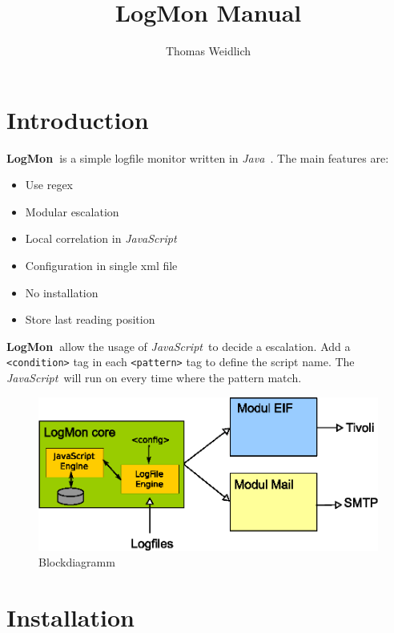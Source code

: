 \documentclass[11pt,a4paper]{article}
\title{LogMon Manual}
\author{Thomas Weidlich}
\newcommand{\logmon}{\textbf{LogMon\ }}
\newcommand{\js}{\textit{JavaScript\ }}
\newcommand{\java}{\textit{Java\ }}
\begin{document}
\maketitle
\tableofcontents
\newpage
\section{Introduction}

\logmon is a simple logfile monitor written in \java. The main features are:

\begin{itemize}
  \item Use regex
  \item Modular escalation
  \item Local correlation in \js
  \item Configuration in single xml file
  \item No installation
  \item Store last reading position
\end{itemize}

\logmon allow the usage of \js to decide a escalation. Add a
\verb#<condition># tag in each \verb#<pattern># tag to define the script name.
The \js will run on every time where the pattern match.


\begin{figure}[h]
\centering
\includegraphics{img/LogMon.eps}
\caption{Blockdiagramm}
\end{figure}

\section{Installation}
\end{document}
